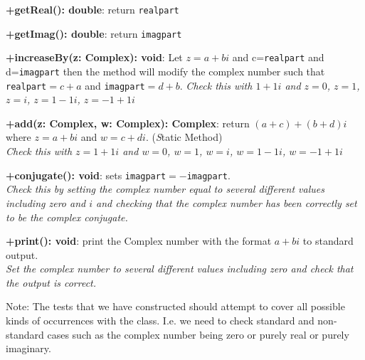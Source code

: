 \documentclass[11pt,a4paper]{article}
\begin{document}
{\bf +getReal(): double}: return \texttt{realpart}

{\bf +getImag(): double}: return \texttt{imagpart}

{\bf +increaseBy(z: Complex): void}: Let $z=a+bi$ and c=\texttt{realpart}
and d=\texttt{imagpart} then the method will modify the complex number such that
\texttt{realpart}$=c+a$ and \texttt{imagpart}$=d+b$.
{\it Check this with $1+1i$ and $z=0$, $z=1$, $z=i$, $z=1-1i$, $z=-1+1i$}

{\bf +add(z: Complex, w: Complex): Complex}: return  $(a+c)+(b+d)i$ where $z=a+bi$ and $w=c+di$. (\emph Static Method)\\
{\it Check this with $z=1+1i$ and $w=0$, $w=1$, $w=i$, $w=1-1i$, $w=-1+1i$}

{\bf +conjugate(): void}: sets \texttt{imagpart}$=-$\texttt{imagpart}.\\
{\it Check this by setting the complex number equal to several different values including zero and $i$ and checking that the complex number has been correctly set to be the complex conjugate.}

{\bf +print(): void}: print the Complex number with the format $a+bi$
to standard output.\\
{\it Set the complex number to several different values including zero and check that the
  output is correct.}

Note: The tests that we have constructed should attempt to cover all possible
kinds of occurrences with the class. I.e. we need to check standard and
non-standard cases such as the complex number being zero or purely real or purely
imaginary.
\end{document}
